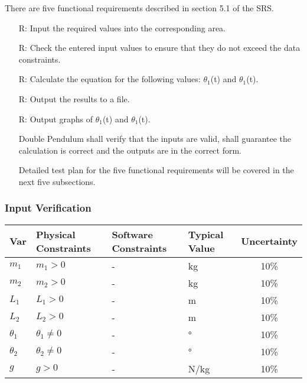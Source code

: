 \documentclass[12pt, titlepage]{article}
\newcounter{reqnum} %
\begin{document}
There are five functional requirements described in section 5.1 of the SRS.

\noindent \begin{itemize}

\item[R\refstepcounter{reqnum}\thereqnum \label{R_Inputs}:] Input the required
values into the corresponding area.
\item[R\refstepcounter{reqnum}\thereqnum \label{R_VarifyInputs}:] Check the
entered input values to ensure that they do not exceed the data constraints.
\item[R\refstepcounter{reqnum}\thereqnum \label{R_Calculate}:] Calculate the
equation for the following values: $\theta_1$(t) and $\theta_1$(t).
\item[R\refstepcounter{reqnum}\thereqnum \label{R_Output}:] Output the results
to a file.
\item[R\refstepcounter{reqnum}\thereqnum \label{R_Graphs}:] Output graphs of
$\theta_1$(t) and $\theta_1$(t).

Double Pendulum shall verify that the inputs are valid, shall guarantee the
calculation is correct and the outputs are in the correct form.

Detailed test plan for the five functional requirements will be covered in the
next five subsections.
\end{itemize}

\subsubsection{Input Verification}\label{InputVerif}

\begin{table}[H]
  \caption{Input Variables} \label{TblInputVar}
  \renewcommand{\arraystretch}{1.2}
\noindent \begin{longtable*}{l l l l c} 
  \toprule
  \textbf{Var} & \textbf{Physical Constraints} & \textbf{Software Constraints} &
                             \textbf{Typical Value} & \textbf{Uncertainty}\\
  \midrule 
  $m_1$ & $m_1 > 0$ & - & \si[per-mode=symbol] {\kilogram} & 10\%
  \\
  $m_2$ & $m_2 > 0$ & - & \si[per-mode=symbol] {\kilogram} & 10\%
  \\
  $L_1$ & $L_1 > 0$ & - & \si[per-mode=symbol] {\metre} & 10\%
  \\
  $L_2$ & $L_2 > 0$ & - & \si[per-mode=symbol] {\metre} & 10\%
  \\
  $\theta_1$ & $\theta_1 \neq 0$ & - & \si[per-mode=symbol] {\degree} & 10\%
  \\
  $\theta_2$ & $\theta_2 \neq 0$ & - & \si[per-mode=symbol] {\degree} & 10\%
  \\
  $g$ & $g > 0$ & - & \si[per-mode=symbol] {\newton\per\kilogram} & 10\%
  \\
  \bottomrule
\end{longtable*}
\end{table}
\end{document}
